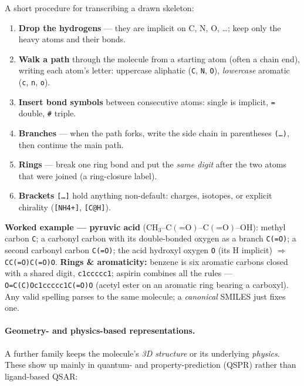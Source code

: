 \documentclass[11pt, oneside]{book}
\begin{document}
\begin{exbox}[title={Writing a SMILES by hand: structure $\to$ string}]
A short procedure for transcribing a drawn skeleton:
\begin{enumerate}
  \item \textbf{Drop the hydrogens} --- they are implicit on C, N, O, \dots; keep
        only the heavy atoms and their bonds.
  \item \textbf{Walk a path} through the molecule from a starting atom (often a
        chain end), writing each atom's letter: uppercase aliphatic
        (\texttt{C}, \texttt{N}, \texttt{O}), \emph{lowercase} aromatic
        (\texttt{c}, \texttt{n}, \texttt{o}).
  \item \textbf{Insert bond symbols} between consecutive atoms: single is implicit,
        \texttt{=} double, \texttt{\#} triple.
  \item \textbf{Branches} --- when the path forks, write the side chain in
        parentheses \texttt{(\dots)}, then continue the main path.
  \item \textbf{Rings} --- break one ring bond and put the \emph{same digit} after
        the two atoms that were joined (a ring-closure label).
  \item \textbf{Brackets} \texttt{[\dots]} hold anything non-default: charges,
        isotopes, or explicit chirality (\texttt{[NH4+]}, \texttt{[C@H]}).
\end{enumerate}
\textbf{Worked example --- pyruvic acid} ($\text{CH}_3\text{--C}(\text{=O})\text{--C}(\text{=O})\text{--OH}$):
methyl carbon \texttt{C}; a carbonyl carbon with its double-bonded oxygen as a
branch \texttt{C(=O)}; a second carbonyl carbon \texttt{C(=O)}; the acid hydroxyl
oxygen \texttt{O} (its H implicit) $\Rightarrow$ \texttt{CC(=O)C(=O)O}.
\textbf{Rings \& aromaticity:} benzene is six aromatic carbons closed with a shared
digit, \texttt{c1ccccc1}; aspirin combines all the rules ---
\texttt{O=C(C)Oc1ccccc1C(=O)O} (acetyl ester on an aromatic ring bearing a
carboxyl). Any valid spelling parses to the same molecule; a \emph{canonical}
SMILES just fixes one.
\end{exbox}

\paragraph{Geometry- and physics-based representations.} A further family keeps
the molecule's \emph{3D structure} or its underlying \emph{physics}. These show up
mainly in quantum- and property-prediction (QSPR) rather than ligand-based QSAR:
\end{document}
